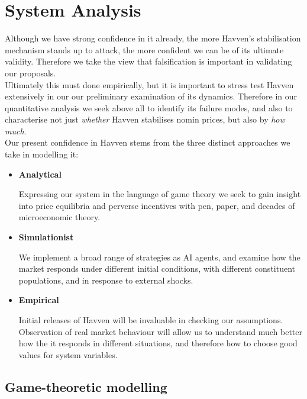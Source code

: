 \section{System Analysis}

Although we have strong confidence in it already, the more Havven's stabilisation mechanism
stands up to attack, the more confident we can be of its ultimate validity.
Therefore we take the view that falsification is important in validating our
proposals. \\

\noindent Ultimately this must done empirically, but it is important to stress test
Havven extensively in our our preliminary examination of its dynamics.
Therefore in our quantitative analysis we seek above all to identify its failure
modes, and also to characterise not just \textit{whether} Havven stabilises
nomin prices, but also by \textit{how much}.\\

\noindent Our present confidence in Havven stems from the three distinct approaches 
we take in modelling it:
\begin{itemize}
    \item[] \textbf{Analytical}
    
    Expressing our system in the language of game theory we seek to gain insight
    into price equilibria and perverse incentives with pen, paper, and decades of
    microeconomic theory.

    \item[] \textbf{Simulationist}

    We implement a broad range of strategies as AI agents, and examine how the
    market responds under different initial conditions, with different constituent
    populations, and in response to external shocks.

    \item[] \textbf{Empirical}

    Initial releases of Havven will be invaluable in checking our assumptions.
    Observation of real market behaviour will allow us to understand much better
    how the it responds in different situations, and therefore how to choose good values
    for system variables.
\end{itemize}

\subsection{Game-theoretic modelling}

